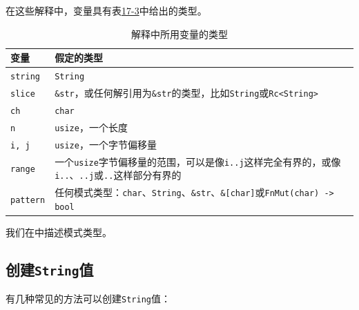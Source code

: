 在这些解释中，变量具有表\hyperref[t17-3]{17-3}中给出的类型。

\begin{longtable}{p{}p{}}
    \caption{解释中所用变量的类型}
    \label{t17-3}\\
    \hline
    \textbf{变量} & \textbf{假定的类型} \\
    \hline
    \texttt{string} & \texttt{String} \\
    \hline
    \rowcolor{tablecolor}
    \texttt{slice} & \texttt{\&str}，或任何解引用为\texttt{\&str}的类型，比如\texttt{String}或\texttt{Rc<String>} \\
    \hline
    \texttt{ch} & \texttt{char} \\
    \hline
    \rowcolor{tablecolor}
    \texttt{n} & \texttt{usize}，一个长度 \\
    \hline
    \texttt{i, j} & \texttt{usize}，一个字节偏移量 \\
    \hline
    \rowcolor{tablecolor}
    \texttt{range} & 一个\texttt{usize}字节偏移量的范围，可以是像\texttt{i..j}这样完全有界的，或像\texttt{i..}、\texttt{..j}或\texttt{..}这样部分有界的 \\
    \hline
    \texttt{pattern} & 任何模式类型：\texttt{char}、\texttt{String}、\texttt{\&str}、\texttt{\&[char]}或\texttt{FnMut(char) -> bool} \\
    \hline
\end{longtable}

我们在中描述模式类型。

\subsection{创建\texttt{String}值}

有几种常见的方法可以创建\texttt{String}值：




